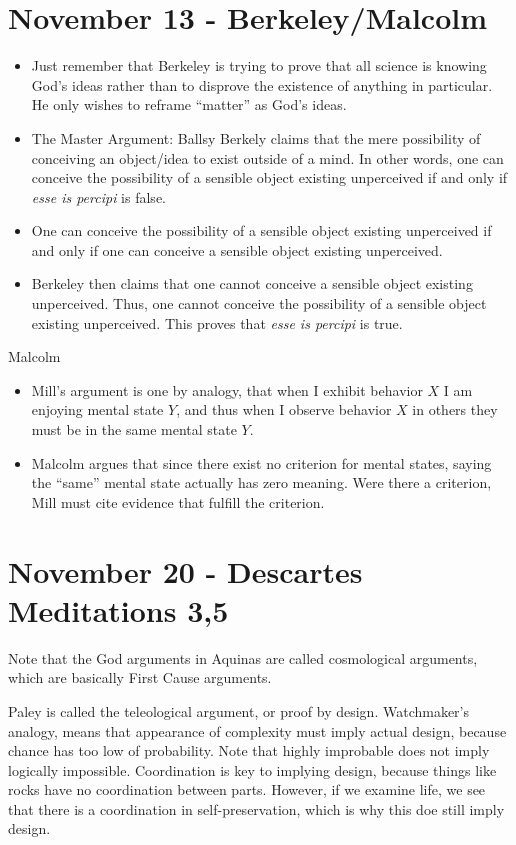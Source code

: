 \documentclass{report}
\begin{document}
\section{November 13 - Berkeley/Malcolm}

\begin{itemize}
\item Just remember that Berkeley is trying to prove that all science is knowing God's ideas rather than to disprove the existence of anything in particular. He only wishes to reframe ``matter'' as God's ideas. 
\item The Master Argument: Ballsy Berkely claims that the mere possibility of conceiving an object/idea to exist outside of a mind. In other words, one can conceive the possibility of a sensible object existing unperceived if and only if \emph{esse is percipi} is false.
\item One can conceive the possibility of a sensible object existing unperceived if and only if one can conceive a sensible object existing unperceived. 
\item Berkeley then claims that one cannot conceive a sensible object existing unperceived. Thus, one cannot conceive the possibility of a sensible object existing unperceived. This proves that \emph{esse is percipi} is true.
\end{itemize}

Malcolm

\begin{itemize}
\item Mill's argument is one by analogy, that when I exhibit behavior $X$ I am enjoying mental state $Y$, and thus when I observe behavior $X$ in others they must be in the same mental state $Y$. 
\item Malcolm argues that since there exist no criterion for mental states, saying the ``same'' mental state actually has zero meaning. Were there a criterion, Mill must cite evidence that fulfill the criterion. 
\end{itemize}

\section{November 20 - Descartes Meditations 3,5}

Note that the God arguments in Aquinas are called cosmological arguments, which are basically First Cause arguments.

Paley is called the teleological argument, or proof by design. Watchmaker's analogy, means that appearance of complexity must imply actual design, because chance has too low of probability. Note that highly improbable does not imply logically impossible. Coordination is key to implying design, because things like rocks have no coordination between parts. However, if we examine life, we see that there is a coordination in self-preservation, which is why this doe still imply design. 
\end{document}
